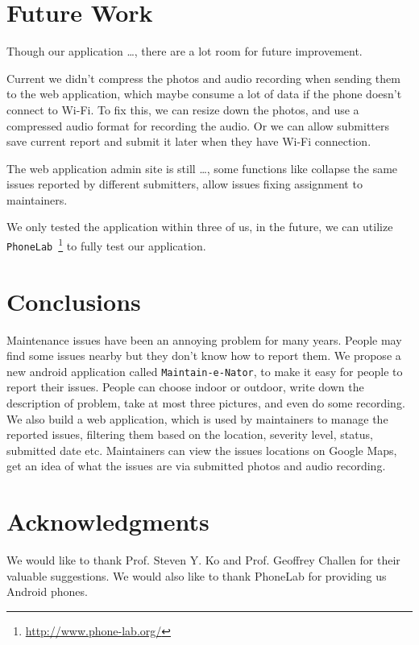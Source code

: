 \documentclass{acm_proc_article-sp}
\begin{document}
\section{Future Work}
Though our application \ldots, there are a lot room for future improvement.
\begin{inparaenum}[(i)]
 \item Current we didn't compress the photos and audio recording when sending them to the web application, which maybe consume a lot of data if the
 phone doesn't connect to Wi-Fi. To fix this, we can resize down the photos, and use a compressed audio format for recording the audio. Or we can allow
 submitters save current report and submit it later when they have Wi-Fi connection.
 \item The web application admin site is still \ldots, some functions like collapse the same issues reported by different submitters, allow issues fixing
 assignment to maintainers.
 \item We only tested the application within three of us, in the future, we can utilize \texttt{PhoneLab}~\footnote{\url{http://www.phone-lab.org/}} to
 fully test our application.
\end{inparaenum}

\section{Conclusions}
Maintenance issues have been an annoying problem for many years. People may find some issues nearby but they don't know how to report them. 
We propose a new android application called \texttt{Maintain-e-Nator}, to make it easy for people to report their issues. People can choose indoor or outdoor, 
write down the description of problem, take at most three pictures, and even do some recording. We also build a web application, 
which is used by maintainers to manage the reported issues, filtering them based on the location, severity level, status, submitted date etc. 
Maintainers can view the issues locations on Google Maps, get an idea of what the issues are via submitted photos and audio recording.

\section{Acknowledgments}
We would like to thank Prof. Steven Y. Ko and Prof. Geoffrey Challen for their valuable suggestions. We would also like to thank 
PhoneLab for providing us Android phones.
\end{document}
